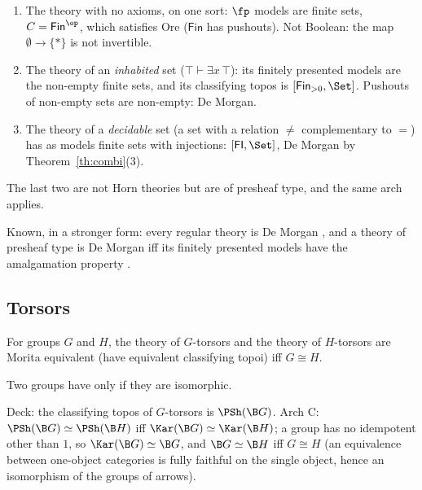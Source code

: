 \begin{example}
\begin{enumerate}
\item The theory with no axioms, on one sort: $\fp$ models are finite sets, $C = \mathsf{Fin}^{\op}$, which satisfies Ore ($\mathsf{Fin}$ has pushouts). Not Boolean: the map $\emptyset\to\{\ast\}$ is not invertible.
\item The theory of an \emph{inhabited} set ($\top\vdash\exists x\,\top$): its finitely presented models are the non-empty finite sets, and its classifying topos is $[\mathsf{Fin}_{>0},\Set]$. Pushouts of non-empty sets are non-empty: De Morgan.
\item The theory of a \emph{decidable} set (a set with a relation $\neq$ complementary to $=$) has as models finite sets with injections: $[\mathsf{FI},\Set]$, De Morgan by Theorem~\ref{th:combi}(3).
\end{enumerate}
The last two are not Horn theories but are of presheaf type, and the same arch applies.
\end{example}

\status{} Known, in a stronger form: every regular theory is De Morgan \cite[Thm~3.5]{caramello-demorgan}, and a theory of presheaf type is De Morgan iff its finitely presented models have the amalgamation property \cite[Prop.~14]{caramello-chamoun}.

\subsection{Torsors}

\begin{theorem}\label{th:torsors}
For groups $G$ and $H$, the theory of $G$-torsors and the theory of $H$-torsors are Morita equivalent (have equivalent classifying topoi) iff $G\cong H$.
\end{theorem}

\inwords{} Two groups have  only if they are isomorphic.

\gen{} Deck: the classifying topos of $G$-torsors is $\PSh(\B G)$. Arch C: $\PSh(\B G)\simeq\PSh(\B H)$ iff $\Kar(\B G)\simeq\Kar(\B H)$; a group has no idempotent other than $1$, so $\Kar(\B G)\simeq\B G$, and $\B G\simeq\B H$ iff $G\cong H$ (an equivalence between one-object categories is fully faithful on the single object, hence an isomorphism of the groups of arrows).


